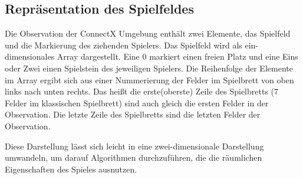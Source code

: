 \subsection{Repräsentation des Spielfeldes}
Die Observation der ConnectX Umgebung enthält zwei Elemente, das Spielfeld und die Markierung des ziehenden Spielers. Das Spielfeld wird als ein-dimensionales Array dargestellt. Eine 0 markiert einen freien Platz und eine Eins oder Zwei einen Spielstein des jeweiligen Spielers. Die Reihenfolge der Elemente im Array ergibt sich aus einer Nummerierung der Felder im Spielbrett von oben links nach unten rechts. Das heißt die erste(oberste) Zeile des Spielbretts (7 Felder im klassischen Spielbrett) sind auch gleich die ersten Felder in der Observation. Die letzte Zeile des Spielbretts sind die letzten Felder der Observation.\\
\par
Diese Darstellung lässt sich leicht in eine zwei-dimensionale Darstellung umwandeln, um darauf Algorithmen durchzuführen, die die räumlichen Eigenschaften des Spieles ausnutzen.

